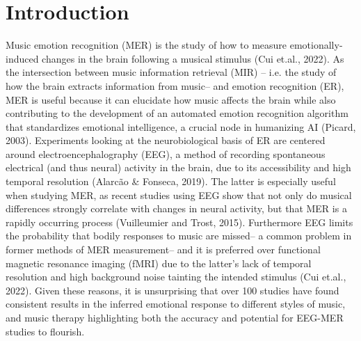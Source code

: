 \documentclass[fleqn,10pt]{SelfArx} %
\affiliation{\textsuperscript{1}\textit{Department of Neuroscience, Harvard University, Cambridge, United States}} %
\affiliation{\textsuperscript{2}\textit{Department of Neuroscience, Harvard University, Cambridge, United States}} %
\begin{document}
\maketitle %
\tableofcontents %
\thispagestyle{empty} %


\section*{Introduction} %

 
Music emotion recognition (MER) is the study of how to measure emotionally-induced changes in the brain following a musical stimulus (Cui et.al., 2022). As the intersection between music information retrieval (MIR) – i.e. the study of how the brain extracts information from music– and emotion recognition (ER), MER is useful because it can elucidate how music affects the brain while also contributing to the development of an automated emotion recognition algorithm that standardizes emotional intelligence, a crucial node in humanizing AI (Picard, 2003). Experiments looking at the neurobiological basis of ER are centered around electroencephalography (EEG), a method of recording spontaneous electrical (and thus neural) activity in the brain, due to its accessibility and high temporal resolution (Alarcão \& Fonseca, 2019). The latter is especially useful when studying MER, as recent studies using EEG show that not only do musical differences strongly correlate with changes in neural activity, but that MER is a rapidly occurring process (Vuilleumier and Trost, 2015). Furthermore EEG limits the probability that bodily responses to music are missed– a common problem in former methods of MER measurement– and it is preferred over functional magnetic resonance imaging (fMRI) due to the latter’s lack of temporal resolution and high background noise tainting the intended stimulus (Cui et.al., 2022). Given these reasons, it is unsurprising that over 100 studies have found consistent results in the inferred emotional response to different styles of music, and music therapy highlighting both the accuracy and potential for EEG-MER studies to flourish. 
\end{document}
